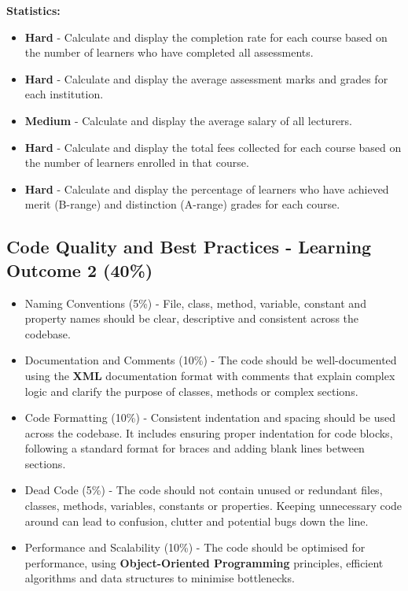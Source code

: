 \documentclass{article}
\begin{document}
\textbf{Statistics:}
\begin{itemize}
    \item \textbf{Hard} - Calculate and display the completion rate for each course based on the number of learners who have completed all assessments.
    \item \textbf{Hard} - Calculate and display the average assessment marks and grades for each institution.
    \item \textbf{Medium} - Calculate and display the average salary of all lecturers.
    \item \textbf{Hard} - Calculate and display the total fees collected for each course based on the number of learners enrolled in that course. 
    \item \textbf{Hard} - Calculate and display the percentage of learners who have achieved merit (B-range) and distinction (A-range) grades for each course.
\end{itemize}

\subsection*{Code Quality and Best Practices - Learning Outcome 2 (40\%)}
\begin{itemize}
    \item Naming Conventions (5\%) - File, class, method, variable, constant and property names should be clear, descriptive and consistent across the codebase. 
    \item Documentation and Comments (10\%) - The code should be well-documented using the \textbf{XML} documentation format with comments that explain complex logic and clarify the purpose of classes, methods or complex sections. 
    \item Code Formatting (10\%) - Consistent indentation and spacing should be used across the codebase. It includes ensuring proper indentation for code blocks, following a standard format for braces and adding blank lines between sections.
    \item Dead Code (5\%) - The code should not contain unused or redundant files, classes, methods, variables, constants or properties. Keeping unnecessary code around can lead to confusion, clutter and potential bugs down the line.
    \item Performance and Scalability (10\%) - The code should be optimised for performance, using \textbf{Object-Oriented Programming} principles, efficient algorithms and data structures to minimise bottlenecks.
\end{itemize}
\end{document}
